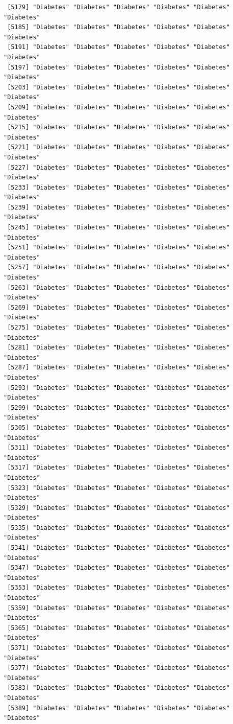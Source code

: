 \documentclass[
  letterpaper,
  DIV=11,
  numbers=noendperiod]{scrartcl}
\begin{document}
\begin{verbatim}
 [5179] "Diabetes" "Diabetes" "Diabetes" "Diabetes" "Diabetes" "Diabetes"
 [5185] "Diabetes" "Diabetes" "Diabetes" "Diabetes" "Diabetes" "Diabetes"
 [5191] "Diabetes" "Diabetes" "Diabetes" "Diabetes" "Diabetes" "Diabetes"
 [5197] "Diabetes" "Diabetes" "Diabetes" "Diabetes" "Diabetes" "Diabetes"
 [5203] "Diabetes" "Diabetes" "Diabetes" "Diabetes" "Diabetes" "Diabetes"
 [5209] "Diabetes" "Diabetes" "Diabetes" "Diabetes" "Diabetes" "Diabetes"
 [5215] "Diabetes" "Diabetes" "Diabetes" "Diabetes" "Diabetes" "Diabetes"
 [5221] "Diabetes" "Diabetes" "Diabetes" "Diabetes" "Diabetes" "Diabetes"
 [5227] "Diabetes" "Diabetes" "Diabetes" "Diabetes" "Diabetes" "Diabetes"
 [5233] "Diabetes" "Diabetes" "Diabetes" "Diabetes" "Diabetes" "Diabetes"
 [5239] "Diabetes" "Diabetes" "Diabetes" "Diabetes" "Diabetes" "Diabetes"
 [5245] "Diabetes" "Diabetes" "Diabetes" "Diabetes" "Diabetes" "Diabetes"
 [5251] "Diabetes" "Diabetes" "Diabetes" "Diabetes" "Diabetes" "Diabetes"
 [5257] "Diabetes" "Diabetes" "Diabetes" "Diabetes" "Diabetes" "Diabetes"
 [5263] "Diabetes" "Diabetes" "Diabetes" "Diabetes" "Diabetes" "Diabetes"
 [5269] "Diabetes" "Diabetes" "Diabetes" "Diabetes" "Diabetes" "Diabetes"
 [5275] "Diabetes" "Diabetes" "Diabetes" "Diabetes" "Diabetes" "Diabetes"
 [5281] "Diabetes" "Diabetes" "Diabetes" "Diabetes" "Diabetes" "Diabetes"
 [5287] "Diabetes" "Diabetes" "Diabetes" "Diabetes" "Diabetes" "Diabetes"
 [5293] "Diabetes" "Diabetes" "Diabetes" "Diabetes" "Diabetes" "Diabetes"
 [5299] "Diabetes" "Diabetes" "Diabetes" "Diabetes" "Diabetes" "Diabetes"
 [5305] "Diabetes" "Diabetes" "Diabetes" "Diabetes" "Diabetes" "Diabetes"
 [5311] "Diabetes" "Diabetes" "Diabetes" "Diabetes" "Diabetes" "Diabetes"
 [5317] "Diabetes" "Diabetes" "Diabetes" "Diabetes" "Diabetes" "Diabetes"
 [5323] "Diabetes" "Diabetes" "Diabetes" "Diabetes" "Diabetes" "Diabetes"
 [5329] "Diabetes" "Diabetes" "Diabetes" "Diabetes" "Diabetes" "Diabetes"
 [5335] "Diabetes" "Diabetes" "Diabetes" "Diabetes" "Diabetes" "Diabetes"
 [5341] "Diabetes" "Diabetes" "Diabetes" "Diabetes" "Diabetes" "Diabetes"
 [5347] "Diabetes" "Diabetes" "Diabetes" "Diabetes" "Diabetes" "Diabetes"
 [5353] "Diabetes" "Diabetes" "Diabetes" "Diabetes" "Diabetes" "Diabetes"
 [5359] "Diabetes" "Diabetes" "Diabetes" "Diabetes" "Diabetes" "Diabetes"
 [5365] "Diabetes" "Diabetes" "Diabetes" "Diabetes" "Diabetes" "Diabetes"
 [5371] "Diabetes" "Diabetes" "Diabetes" "Diabetes" "Diabetes" "Diabetes"
 [5377] "Diabetes" "Diabetes" "Diabetes" "Diabetes" "Diabetes" "Diabetes"
 [5383] "Diabetes" "Diabetes" "Diabetes" "Diabetes" "Diabetes" "Diabetes"
 [5389] "Diabetes" "Diabetes" "Diabetes" "Diabetes" "Diabetes" "Diabetes"

\end{verbatim}
\end{document}
